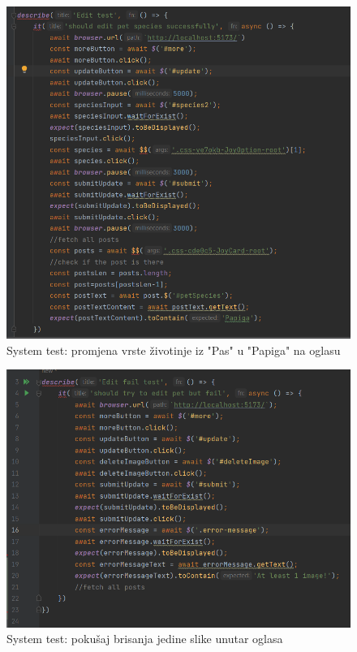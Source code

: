 			\begin{figure}[H]
				\includegraphics[scale=0.7]{slike/sysedit1.PNG} 
				\centering
				\caption{System test: promjena vrste životinje iz "Pas" u "Papiga" na oglasu}
				\label{sysedit1}
			\end{figure}
			
			
			\begin{figure}[H]
				\includegraphics[scale=0.7]{slike/sysedit2.PNG} 
				\centering
				\caption{System test: pokušaj brisanja jedine slike unutar oglasa}
				\label{sysedit2}
			\end{figure}
			
